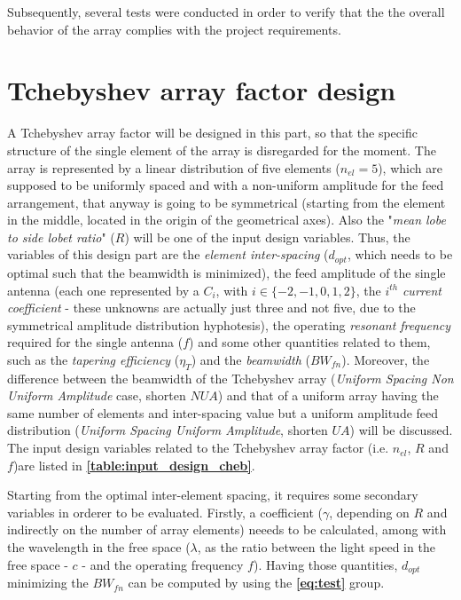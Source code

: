 \documentclass[10 pt,a4paper,twocolumn]{article}
\begin{document}
{Subsequently, several tests were conducted in order to verify that the the overall behavior of the array complies with the project requirements. 

	
\section*{Tchebyshev array factor design}

\indent A Tchebyshev array factor will be designed in this part, so that the specific structure of the single element of the array is disregarded for the moment. The array is represented by a linear distribution of five elements ($n_{el}=5$), which are supposed to be uniformly spaced and with a non-uniform amplitude for the feed arrangement, that anyway is going to be symmetrical (starting from the element in the middle, located in the origin of the geometrical axes). Also the "\emph{mean lobe to side lobet ratio}" ($R$) will be one of the input design variables. Thus, the variables of this design part are the \emph{element inter-spacing} ($d_{opt}$, which needs to be optimal such that the beamwidth is minimized), the feed amplitude of the single antenna (each one represented by a $C_i$, with $i\in\{-2,-1,0,1,2\}$, the $i^{th}$ \emph{current coefficient} - these unknowns are actually just three and not five, due to the symmetrical amplitude distribution hyphotesis), the operating \emph{resonant frequency} required for the single antenna ($f$) and some other quantities related to them, such as the \emph{tapering efficiency} ($\eta_T$) and the \emph{beamwidth} ($BW_{fn}$). Moreover, the difference between the beamwidth of the Tchebyshev array (\emph{Uniform Spacing Non Uniform Amplitude} case, shorten $NUA$) and  that of a uniform array having the same number of elements and inter-spacing value but a uniform amplitude feed distribution  (\emph{Uniform Spacing Uniform Amplitude}, shorten $UA$) will be discussed. The input design variables related to the Tchebyshev array factor (i.e. $n_{el}$, $R$ and $f$)are listed in \textbf{\cref{table:input_design_cheb}}. 

\indent 

Starting from the optimal inter-element spacing, it requires some secondary variables in orderer to be evaluated. Firstly, a coefficient ($\gamma$, depending on $R$ and indirectly on the number of array elements) neeeds to be calculated, among with the wavelength in the free space ($\lambda$, as the ratio between the light speed in the free space - $c$ - and the operating frequency $f$). Having those quantities, $d_{opt}$ minimizing the $BW_{fn}$ can be computed by using the \textbf{\cref{eq:test}} group. 




}
\end{document}
